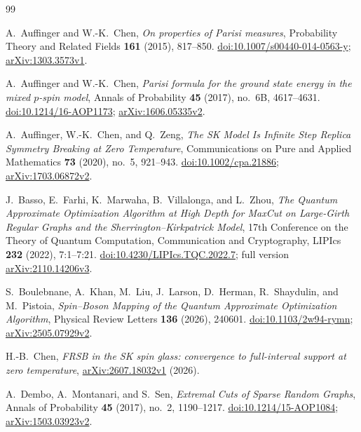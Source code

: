 \begin{thebibliography}{99}
\small
\raggedright

A.~Auffinger and W.-K.~Chen,
\emph{On properties of Parisi measures},
Probability Theory and Related Fields \textbf{161} (2015), 817--850.
\href{https://doi.org/10.1007/s00440-014-0563-y}{doi:10.1007/s00440-014-0563-y};
\href{https://arxiv.org/abs/1303.3573v1}{arXiv:1303.3573v1}.

A.~Auffinger and W.-K.~Chen,
\emph{Parisi formula for the ground state energy in the mixed $p$-spin model},
Annals of Probability \textbf{45} (2017), no.~6B, 4617--4631.
\href{https://doi.org/10.1214/16-AOP1173}{doi:10.1214/16-AOP1173};
\href{https://arxiv.org/abs/1606.05335v2}{arXiv:1606.05335v2}.

A.~Auffinger, W.-K.~Chen, and Q.~Zeng,
\emph{The SK Model Is Infinite Step Replica Symmetry Breaking at Zero
Temperature},
Communications on Pure and Applied Mathematics \textbf{73} (2020), no.~5,
921--943.
\href{https://doi.org/10.1002/cpa.21886}{doi:10.1002/cpa.21886};
\href{https://arxiv.org/abs/1703.06872v2}{arXiv:1703.06872v2}.

J.~Basso, E.~Farhi, K.~Marwaha, B.~Villalonga, and L.~Zhou,
\emph{The Quantum Approximate Optimization Algorithm at High Depth for
MaxCut on Large-Girth Regular Graphs and the Sherrington--Kirkpatrick Model},
17th Conference on the Theory of Quantum Computation, Communication and
Cryptography, LIPIcs \textbf{232} (2022), 7:1--7:21.
\href{https://doi.org/10.4230/LIPIcs.TQC.2022.7}{doi:10.4230/LIPIcs.TQC.2022.7};
full version \href{https://arxiv.org/abs/2110.14206v3}{arXiv:2110.14206v3}.

S.~Boulebnane, A.~Khan, M.~Liu, J.~Larson, D.~Herman, R.~Shaydulin,
and M.~Pistoia,
\emph{Spin--Boson Mapping of the Quantum Approximate Optimization Algorithm},
Physical Review Letters \textbf{136} (2026), 240601.
\href{https://doi.org/10.1103/2w94-rymn}{doi:10.1103/2w94-rymn};
\href{https://arxiv.org/abs/2505.07929v2}{arXiv:2505.07929v2}.

H.-B.~Chen,
\emph{FRSB in the SK spin glass: convergence to full-interval support
at zero temperature},
\href{https://arxiv.org/abs/2607.18032v1}{arXiv:2607.18032v1} (2026).

A.~Dembo, A.~Montanari, and S.~Sen,
\emph{Extremal Cuts of Sparse Random Graphs},
Annals of Probability \textbf{45} (2017), no.~2, 1190--1217.
\href{https://doi.org/10.1214/15-AOP1084}{doi:10.1214/15-AOP1084};
\href{https://arxiv.org/abs/1503.03923v2}{arXiv:1503.03923v2}.


\end{thebibliography}

